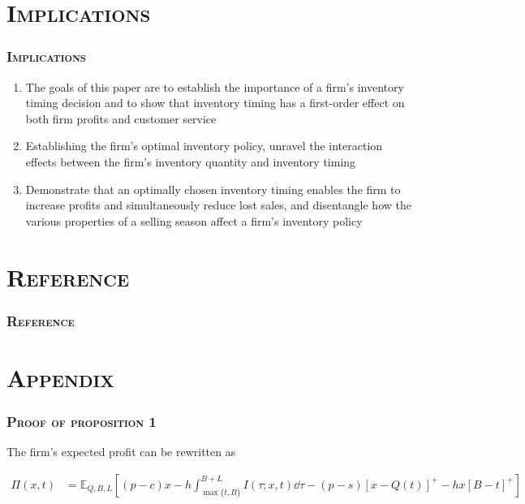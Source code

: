 \documentclass[aspectratio=169]{../presentation}
\begin{document}
    \section{\textsc{Implications}}

    \begin{frame}
        \frametitle{\textsc{Implications}}

        \begin{enumerate}
            \item The goals of this paper are to establish the importance of a firm's inventory timing decision and to show that inventory timing has a first-order effect on both firm profits and customer service
            \item Establishing the firm's optimal inventory policy, unravel the interaction effects between the firm's inventory quantity and inventory timing
            \item Demonstrate that an optimally chosen inventory timing enables the firm to increase profits and simultaneously reduce lost sales, and disentangle how the various properties of a selling season affect a firm's inventory policy
        \end{enumerate}

    \end{frame}

    \section{\textsc{Reference}}

    \begin{frame}[allowframebreaks]
        \frametitle{\textsc{Reference}}
        {
            \scriptsize
            
            
        }
    \end{frame}

    \section{\textsc{Appendix}}

    \begin{frame}
        \frametitle{\textsc{Proof of proposition 1}}

        The firm's expected profit can be rewritten as 

        \begin{equation}
            \begin{aligned}
                \Pi(x, t) &= \mathbb E_{Q, B, L}\left[(p-c)x - h\int_{\max\{t, B\}}^{B+L} I(\tau; x, t)\dd \tau -(p-s)\left[x-Q(t)\right]^+ - hx\left[B-t\right]^+\right] \\
            \end{aligned}
            \label{eq:8}
        \end{equation}

    \end{frame}
\end{document}

